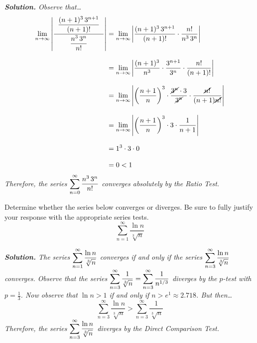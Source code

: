\documentclass[12pt,letterpaper]{exam}
\begin{document}
\begin{questions}
{\itshape \textbf{Solution.} Observe that\dots
	\[
	\begin{aligned}
	\lim_{n \to \infty} \left| \dfrac{\;\;\dfrac{(n + 1)^3 \, 3^{n + 1}}{(n + 1)!}\;\;}{\dfrac{n^3 \, 3^n}{n!}} \right|&= \lim_{n \to \infty} \left| \dfrac{(n + 1)^3 \, 3^{n + 1}}{(n + 1)!} \cdot \dfrac{n!}{n^3 \,3^n} \right| \\[0.3cm]
	&= \lim_{n \to \infty} \left| \dfrac{(n + 1)^3}{n^3} \cdot \dfrac{3^{n + 1}}{3^n} \cdot \dfrac{n!}{(n + 1)!} \right| \\[0.3cm]
	&= \lim_{n \to \infty} \left| \left( \dfrac{n + 1}{n} \right)^3 \cdot \dfrac{\cancel{3^n} \cdot 3}{\cancel{3^n}} \cdot \dfrac{\cancel{n!}}{(n + 1) \cancel{n!}} \right| \\[0.3cm]
	&= \lim_{n \to \infty} \left| \left( \dfrac{n + 1}{n} \right)^3 \cdot 3 \cdot \dfrac{1}{n + 1} \right| \\[0.3cm]
	&= 1^3 \cdot 3 \cdot 0 \\[0.3cm]
	&= 0 < 1
	\end{aligned}
	\]
Therefore, the series $\displaystyle\sum_{n=0}^\infty \dfrac{n^3 \, 3^n}{n!}$ converges absolutely by the Ratio Test.}



\newpage
\question[10] Determine whether the series below converges or diverges. Be sure to fully justify your response with the appropriate series tests.
	\[
	\sum_{n=1}^\infty \dfrac{\ln n}{\sqrt[3]{n}}
	\] \pspace

{\footnotesize\itshape \textbf{Solution.} The series $\displaystyle\sum_{n=1}^\infty \dfrac{\ln n}{\sqrt[3]{n}}$ converges if and only if the series $\displaystyle\sum_{n=3}^\infty \dfrac{\ln n}{\sqrt[3]{n}}$ converges. Observe that the series $\displaystyle\sum_{n=3}^\infty \dfrac{1}{\sqrt[3]{n}}= \sum_{n=3}^\infty \dfrac{1}{n^{1/3}}$ diverges by the $p$-test with $p= \frac{1}{3}$. Now observe that $\ln n > 1$ if and only if $n > e^1 \approx 2.718$. But then\dots
	\[
	\sum_{n=3}^\infty \dfrac{\ln n}{\sqrt[3]{n}} > \sum_{n=3}^\infty \dfrac{1}{\sqrt[3]{n}}
	\]
Therefore, the series $\displaystyle\sum_{n=3}^\infty \dfrac{\ln n}{\sqrt[3]{n}}$ diverges by the Direct Comparison Test. \pspace

}
\end{questions}
\end{document}
